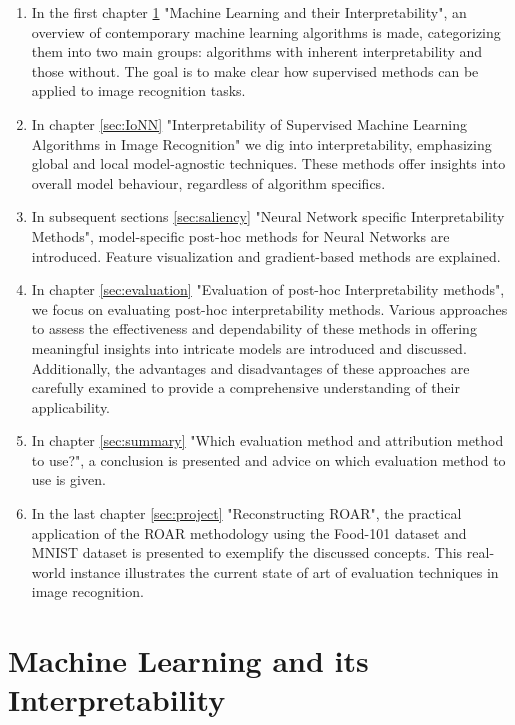 \begin{enumerate}
	\item In the first chapter \ref{sec:MLandI} "Machine Learning and their Interpretability", an overview of contemporary machine learning algorithms is made, categorizing them into two main groups: algorithms with inherent interpretability and those without. The goal is to make clear how supervised methods can be applied to image recognition tasks.
	\item In chapter \ref{sec:IoNN} "Interpretability of Supervised Machine Learning Algorithms in Image Recognition" we dig into interpretability, emphasizing global and local model-agnostic techniques. These methods offer insights into overall model behaviour, regardless of algorithm specifics. 
	\item In subsequent sections \ref{sec:saliency} "Neural Network specific Interpretability Methods", model-specific post-hoc methods for Neural Networks are introduced. Feature visualization and gradient-based methods are explained.
	\item In chapter \ref{sec:evaluation} "Evaluation of post-hoc Interpretability methods", we focus on evaluating post-hoc interpretability methods. Various approaches to assess the effectiveness and dependability of these methods in offering meaningful insights into intricate models are introduced and discussed. Additionally, the advantages and disadvantages of these approaches are carefully examined to provide a comprehensive understanding of their applicability.
	\item In chapter \ref{sec:summary} "Which evaluation method and attribution method to use?", a conclusion is presented and advice on which evaluation method to use is given. 
	\item In the last chapter \ref{sec:project} "Reconstructing ROAR", the practical application of the ROAR methodology using the Food-101 dataset \cite{bossard14} and MNIST dataset \cite{deng2012mnist} is presented to exemplify the discussed concepts. This real-world instance illustrates the current state of art of evaluation techniques in image recognition.
\end{enumerate}

\chapter{Machine Learning and its Interpretability}
\label{sec:MLandI}


